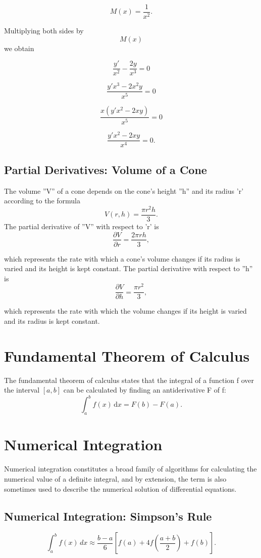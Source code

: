 \documentclass[12pt, a4paper]{article}
\begin{document}
\[ M(x)=\frac{1}{x^2}.\]

Multiplying both sides by \[M(x)\] we obtain

\[\frac{y'}{x^2} - \frac{2y}{x^3} = 0\]

\[\frac{y'x^3 - 2x^2y}{x^5} = 0\]

\[\frac{x(y'x^2 - 2xy)}{x^5} = 0\]

\[\frac{y'x^2 - 2xy}{x^4} = 0.\]


\subsection{Partial Derivatives: Volume of a Cone}

The volume ''V'' of a cone depends on the cone's height ''h'' and its radius 'r' according to the formula
\[V(r, h) = \frac{\pi r^2 h}{3}.\]
The partial derivative of ''V'' with respect to 'r' is
\[\frac{ \partial V}{\partial r} = \frac{ 2 \pi r h}{3},\]

which represents the rate with which a cone's volume changes if its radius is varied and its height is kept constant.
The partial derivative with respect to ''h'' is
\[\frac{ \partial V}{\partial h} = \frac{\pi r^2}{3},\]

which represents the rate with which the volume changes if its height is varied and its radius is kept constant.
\section{Fundamental Theorem of Calculus}
The fundamental theorem of calculus states that the integral of a function f over the interval $[a, b]$ can be calculated by finding an antiderivative F of f:
\[\int_a^b f(x)\,\mathrm dx = F(b) - F(a).\]



\section*{Numerical Integration}
Numerical integration constitutes a broad family of algorithms for calculating the numerical value of a definite integral, and by extension, the term is also sometimes used to describe the numerical solution of differential equations.
\subsection*{Numerical Integration: Simpson's Rule}
\[\int_{a}^{b} f(x) \, dx \approx \frac{b-a}{6}\left[f(a) + 4f\left(\frac{a+b}{2}\right)+f(b)\right].\]
\end{document}
